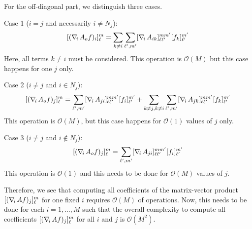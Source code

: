 For the off-diagonal part, we distinguish three cases.

Case 1 ($i=j$ and necessarily $i\neq N_j$):
\[
	[(\nabla_{\!i}\, A_o f)_i]_\ell^m 
	= 	\sum_{k\neq i} \sum_{\ell',m'} [\nabla_{\!i}\, A_{ik}]_{\ell \ell'}^{m m'} [f_k]_{\ell'}^{m'} 
\]
Here, all terms $k\neq i$ must be considered. This operation is $\mathcal O(M)$ but this case happens for one $j$ only.

Case 2 ($i\neq j$ and $i\in N_j$):
\[
	[(\nabla_{\!i}\, A_o f)_j]_\ell^m 
	= \sum_{\ell',m'} [\nabla_{\!i}\, A_{ji}]_{\ell \ell'}^{m m'} [f_i]_{\ell'}^{m'} 
	+ \sum_{k\neq j, k\neq i} \sum_{\ell',m'} [\nabla_{\!i}\, A_{jk}]_{\ell \ell'}^{m m'} [f_k]_{\ell'}^{m'} 
\]
This operation is $\mathcal O(M)$, but this case happens for $\mathcal O(1)$ values of $j$ only.

Case 3 ($i\neq j$ and $i\not \in N_j$):
\[
	[(\nabla_{\!i}\, A_o f)_j]_\ell^m 
	= \sum_{\ell',m'} [\nabla_{\!i}\, A_{ji}]_{\ell \ell'}^{m m'} [f_i]_{\ell'}^{m'} 
\]
This operation is $\mathcal O(1)$ and this needs to be done for $\mathcal O(M)$ values of $j$.

Therefore, we see that computing all coefficients of the matrix-vector product $[(\nabla_{\!i}\, A f)_j]_\ell^m $ for one fixed $i$ requires $\mathcal O(M)$ of operations. 
Now, this needs to be done for each $i=1,\ldots,M$ such that the overall complexity to compute all coefficients $[(\nabla_{\!i}\, A f)_j]_\ell^m $ for all $i$ and $j$ is $\mathcal O(M^2)$.

